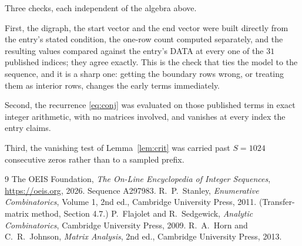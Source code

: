 \documentclass[11pt,a4paper]{article}
\theoremstyle{plain}
\theoremstyle{definition}
\begin{document}
Three checks, each independent of the algebra above.

First, the digraph, the start vector and the end vector were built directly from the
entry's stated condition, the one-row count computed separately, and the resulting values
compared against the entry's DATA at every one of the $31$ published indices; they
agree exactly. This is the check that ties the model to the sequence, and it is a sharp one:
getting the boundary rows wrong, or treating them as interior rows, changes the early terms
immediately.

Second, the recurrence \eqref{eq:conj} was evaluated on those published terms in exact
integer arithmetic, with no matrices involved, and vanishes at every index the entry claims.

Third, the vanishing test of Lemma~\ref{lem:crit} was carried past $S=1024$ consecutive
zeros rather than to a sampled prefix.

\begin{thebibliography}{9}
 The OEIS Foundation, \emph{The On-Line Encyclopedia of Integer
Sequences}, \url{https://oeis.org}, 2026. Sequence A297983.
 R.~P.~Stanley, \emph{Enumerative Combinatorics}, Volume 1, 2nd ed.,
Cambridge University Press, 2011. (Transfer-matrix method, Section 4.7.)
 P.~Flajolet and R.~Sedgewick, \emph{Analytic Combinatorics}, Cambridge
University Press, 2009.
 R.~A.~Horn and C.~R.~Johnson, \emph{Matrix Analysis}, 2nd ed., Cambridge
University Press, 2013.
\end{thebibliography}
\end{document}
